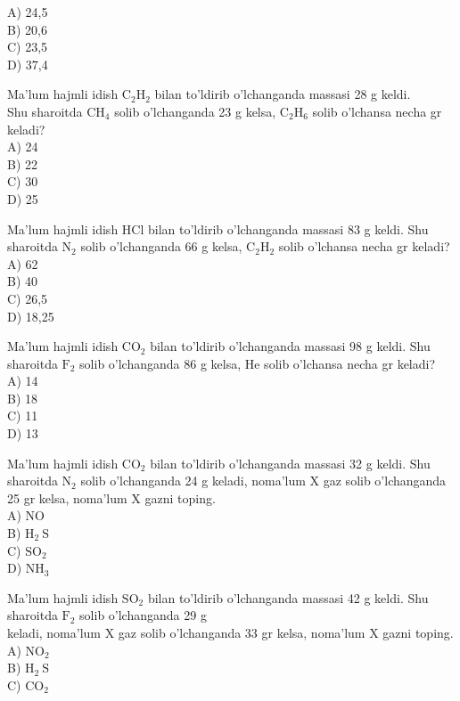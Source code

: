 A) 24,5\\
B) 20,6\\
C) 23,5\\
D) 37,4
  \item Ma'lum hajmli idish $\mathrm{C}_{2} \mathrm{H}_{2}$ bilan to'ldirib o'lchanganda massasi 28 g keldi.\\
Shu sharoitda $\mathrm{CH}_{4}$ solib o'lchanganda 23 g kelsa, $\mathrm{C}_{2} \mathrm{H}_{6}$ solib o'lchansa necha gr keladi?\\
A) 24\\
B) 22\\
C) 30\\
D) 25
  \item Ma'lum hajmli idish HCl bilan to'ldirib o'lchanganda massasi 83 g keldi. Shu sharoitda $\mathrm{N}_{2}$ solib o'lchanganda 66 g kelsa, $\mathrm{C}_{2} \mathrm{H}_{2}$ solib o'lchansa necha gr keladi?\\
A) 62\\
B) 40\\
C) 26,5\\
D) 18,25
  \item Ma'lum hajmli idish $\mathrm{CO}_{2}$ bilan to'ldirib o'lchanganda massasi 98 g keldi. Shu sharoitda $\mathrm{F}_{2}$ solib o'lchanganda 86 g kelsa, He solib o'lchansa necha gr keladi?\\
A) 14\\
B) 18\\
C) 11\\
D) 13
  \item Ma'lum hajmli idish $\mathrm{CO}_{2}$ bilan to'ldirib o'lchanganda massasi 32 g keldi. Shu sharoitda $\mathrm{N}_{2}$ solib o'lchanganda 24 g keladi, noma'lum X gaz solib o'lchanganda 25 gr kelsa, noma'lum X gazni toping.\\
A) NO\\
B) $\mathrm{H}_{2} \mathrm{~S}$\\
C) $\mathrm{SO}_{2}$\\
D) $\mathrm{NH}_{3}$
  \item Ma'lum hajmli idish $\mathrm{SO}_{2}$ bilan to'ldirib o'lchanganda massasi 42 g keldi. Shu sharoitda $\mathrm{F}_{2}$ solib o'lchanganda 29 g\\
keladi, noma'lum X gaz solib o'lchanganda 33 gr kelsa, noma'lum X gazni toping.\\
A) $\mathrm{NO}_{2}$\\
B) $\mathrm{H}_{2} \mathrm{~S}$\\
C) $\mathrm{CO}_{2}$\\
